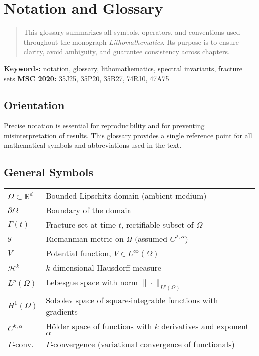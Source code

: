 
\chapter*{Notation and Glossary}

\begin{abstract}
This glossary summarizes all symbols, operators, and conventions used
throughout the monograph \emph{Lithomathematics}. Its purpose is to ensure
clarity, avoid ambiguity, and guarantee consistency across chapters.
\end{abstract}

\noindent\textbf{Keywords:} notation, glossary, lithomathematics, spectral invariants, fracture sets  
\noindent\textbf{MSC 2020:} 35J25, 35P20, 35B27, 74R10, 47A75

\section*{Orientation}
Precise notation is essential for reproducibility and for preventing
misinterpretation of results. This glossary provides a single reference
point for all mathematical symbols and abbreviations used in the text.

\section*{General Symbols}
\begin{tabular}{ll}
$\Omega \subset \mathbb{R}^d$ & Bounded Lipschitz domain (ambient medium) \\
$\partial \Omega$ & Boundary of the domain \\
$\Gamma(t)$ & Fracture set at time $t$, rectifiable subset of $\Omega$ \\
$g$ & Riemannian metric on $\Omega$ (assumed $C^{2,\alpha}$) \\
$V$ & Potential function, $V \in L^\infty(\Omega)$ \\
$\mathcal{H}^k$ & $k$-dimensional Hausdorff measure \\
$L^p(\Omega)$ & Lebesgue space with norm $\|\cdot\|_{L^p(\Omega)}$ \\
$H^1(\Omega)$ & Sobolev space of square-integrable functions with gradients \\
$C^{k,\alpha}$ & Hölder space of functions with $k$ derivatives and exponent $\alpha$ \\
$\Gamma$-conv. & $\Gamma$-convergence (variational convergence of functionals) \\
\end{tabular}

